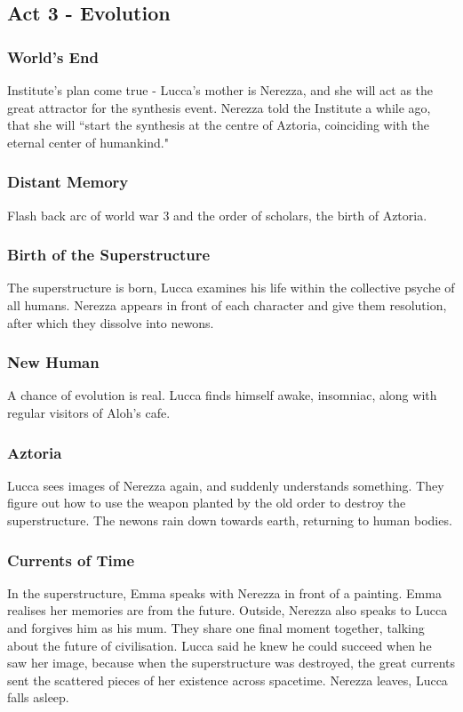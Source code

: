 \documentclass[11pt]{article}
\begin{document}
	\subsection{Act 3 - Evolution}
		\subsubsection{World's End}
		Institute's plan come true - Lucca's mother is Nerezza, and she will act as the great attractor for the synthesis event.
		Nerezza told the Institute a while ago, that she will ``start the synthesis at the centre of Aztoria, coinciding with the eternal center of humankind."
		\subsubsection{Distant Memory}
		Flash back arc of world war 3 and the order of scholars, the birth of Aztoria.
		\subsubsection{Birth of the Superstructure}
		The superstructure is born, Lucca examines his life within the collective psyche of all humans. 
		Nerezza appears in front of each character and give them resolution, after which they dissolve into newons.
		\subsubsection{New Human}
		A chance of evolution is real. 
		Lucca finds himself awake, insomniac, along with regular visitors of Aloh's cafe.
		\subsubsection{Aztoria}
		Lucca sees images of Nerezza again, and suddenly understands something.
		They figure out how to use the weapon planted by the old order to destroy the superstructure.
		The newons rain down towards earth, returning to human bodies.
		\subsubsection{Currents of Time}
		In the superstructure, Emma speaks with Nerezza in front of a painting.
		Emma realises her memories are from the future.
		Outside, Nerezza also speaks to Lucca and forgives him as his mum.
		They share one final moment together, talking about the future of civilisation.
		Lucca said he knew he could succeed when he saw her image, because when the superstructure was destroyed, the great currents sent the scattered pieces of her existence across spacetime.
		Nerezza leaves, Lucca falls asleep.
\end{document}
